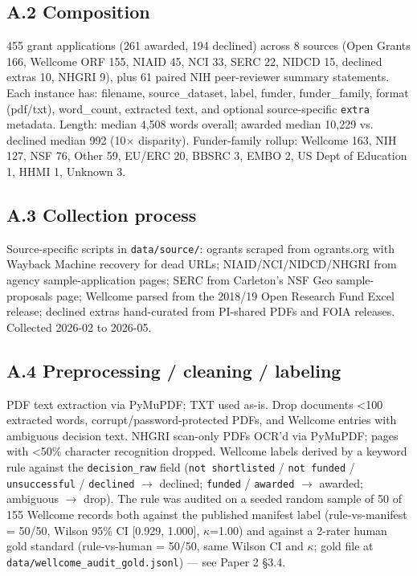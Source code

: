 \documentclass[11pt]{article}
\begin{document}
\subsection{A.2 Composition}
455 grant applications (261 awarded, 194 declined) across 8 sources (Open Grants 166, Wellcome ORF 155, NIAID 45, NCI 33, SERC 22, NIDCD 15, declined extras 10, NHGRI 9), plus 61 paired NIH peer-reviewer summary statements. Each instance has: filename, source\_dataset, label, funder, funder\_family, format (pdf/txt), word\_count, extracted text, and optional source-specific \texttt{extra} metadata. Length: median 4,508 words overall; awarded median 10,229 vs. declined median 992 (10$\times$ disparity). Funder-family rollup: Wellcome 163, NIH 127, NSF 76, Other 59, EU/ERC 20, BBSRC 3, EMBO 2, US Dept of Education 1, HHMI 1, Unknown 3.

\subsection{A.3 Collection process}
Source-specific scripts in \texttt{data/{source}/}: ogrants scraped from ogrants.org with Wayback Machine recovery for dead URLs; NIAID/NCI/NIDCD/NHGRI from agency sample-application pages; SERC from Carleton's NSF Geo sample-proposals page; Wellcome parsed from the 2018/19 Open Research Fund Excel release; declined extras hand-curated from PI-shared PDFs and FOIA releases. Collected 2026-02 to 2026-05.

\subsection{A.4 Preprocessing / cleaning / labeling}
PDF text extraction via PyMuPDF; TXT used as-is. Drop documents <100 extracted words, corrupt/password-protected PDFs, and Wellcome entries with ambiguous decision text. NHGRI scan-only PDFs OCR'd via PyMuPDF; pages with <50\% character recognition dropped. Wellcome labels derived by a keyword rule against the \texttt{decision\_raw} field (\texttt{not shortlisted} / \texttt{not funded} / \texttt{unsuccessful} / \texttt{declined} $\rightarrow$ declined; \texttt{funded} / \texttt{awarded} $\rightarrow$ awarded; ambiguous $\rightarrow$ drop). The rule was audited on a seeded random sample of 50 of 155 Wellcome records both against the published manifest label (rule-vs-manifest = 50/50, Wilson 95\% CI [0.929, 1.000], $\kappa$=1.00) and against a 2-rater human gold standard (rule-vs-human = 50/50, same Wilson CI and $\kappa$; gold file at \texttt{data/wellcome\_audit\_gold.jsonl}) --- see Paper 2 §3.4.
\end{document}
